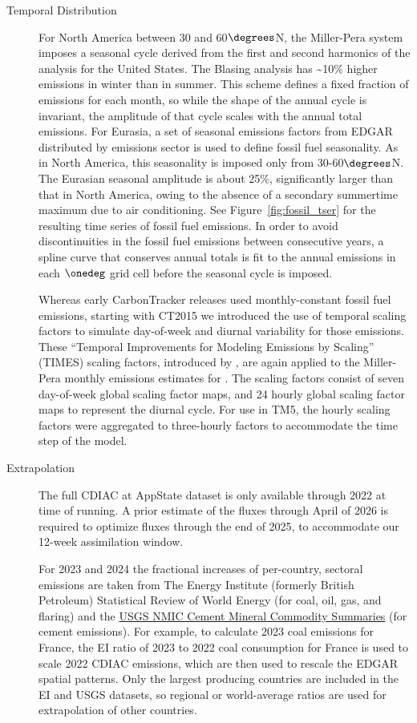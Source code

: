 \begin{description}
\item[Temporal Distribution] For North America between 30 and
  60$\degrees$N, the Miller-Pera system imposes a seasonal cycle derived
  from the first and second harmonics \citep{thoning89a} of the
  \citet{blasing04a} analysis for the United States. The Blasing
  analysis has \textasciitilde{}10\% higher emissions in winter than
  in summer.  This scheme defines a fixed fraction of emissions for
  each month, so while the shape of the annual cycle is invariant, the
  amplitude of that cycle scales with the annual total emissions. For
  Eurasia, a set of seasonal emissions factors from EDGAR distributed
  by emissions sector is used to define fossil fuel seasonality. As
  in North America, this seasonality is imposed only from
  30{-}60$\degrees$N. The Eurasian seasonal amplitude is about 25\%,
  significantly larger than that in North America, owing to the
  absence of a secondary summertime maximum due to air conditioning.
  See Figure~\ref{fig:fossil_tser} for the resulting time series
  of fossil fuel emissions. In order to avoid discontinuities in the
  fossil fuel emissions between consecutive years, a spline curve that
  conserves annual totals \citep{rasmussen91a} is fit to the annual
  emissions in each $\onedeg$ grid cell before the seasonal cycle is
  imposed.

  Whereas early CarbonTracker releases used monthly-constant fossil fuel
emissions, starting with CT2015 we introduced the use of temporal
scaling factors to simulate day-of-week and diurnal variability for
those emissions.  These ``Temporal Improvements for Modeling Emissions
by Scaling'' (TIMES) scaling factors, introduced by \citet{nassar13a},
are again applied to the Miller-Pera monthly emissions estimates for
\ctver.  The scaling factors consist of seven day-of-week global
scaling factor maps, and 24 hourly global scaling factor maps to
represent the diurnal cycle.  For use in TM5, the hourly scaling
factors were aggregated to three-hourly factors to accommodate the
time step of the model.


\item[Extrapolation] The full CDIAC at AppState dataset is
  only available through 2022 at time of running. A prior
  estimate of the fluxes through April of 2026 is required to optimize
  fluxes through the end of 2025, to accommodate our 12-week
  assimilation window.

  For 2023 and 2024 the fractional increases of
  per-country, sectoral emissions are taken from The Energy Institute
  (formerly British Petroleum) Statistical Review of World Energy
  \citep{ei25a} (for coal, oil, gas, and flaring) and the
  \href{https://www.usgs.gov/centers/national-minerals-information-center/cement-statistics-and-information}{USGS
    NMIC Cement Mineral Commodity Summaries} (for cement emissions).
  For example, to calculate 2023 coal emissions for France, the
  EI ratio of 2023 to 2022 coal consumption for France is used to
  scale 2022 CDIAC emissions, which are then used to rescale the
  EDGAR spatial patterns. Only the largest producing countries are
  included in the EI and USGS datasets, so regional or world-average
  ratios are used for extrapolation of other countries.


\end{description}
